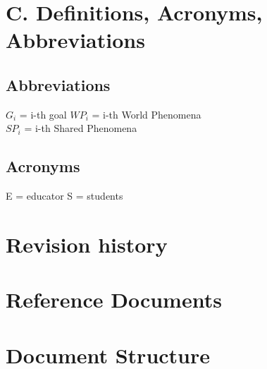 \section{C. Definitions, Acronyms, Abbreviations}
\subsection{Abbreviations}
\(G_i\) = i-th goal
\(WP_i\) = i-th World Phenomena\\
\(SP_i\) = i-th Shared Phenomena\\

\subsection{Acronyms}
E = educator
S = students
\section{Revision history}
\section{Reference Documents}
\section{Document Structure}
